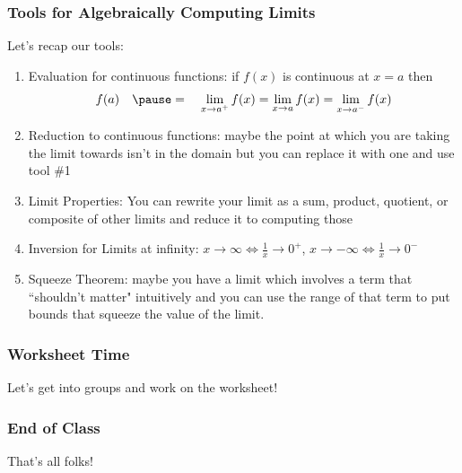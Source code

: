 \documentclass{ltx-talk}
\begin{document}
\begin{frame}
  \frametitle{Tools for Algebraically Computing Limits}

  Let's recap our tools: \pause
  \begin{enumerate}
    \item Evaluation for continuous functions: \pause if $f(x)$ is continuous at $x = a$ then \pause
      \begin{equation}
        f(a) \quad \pause = \quad \lim_{x \rightarrow a^{+}} f(x) = \lim_{x \rightarrow a} f(x) = \lim_{x \rightarrow a^{-}} f(x)
      \end{equation} \pause
    \item Reduction to continuous functions: \pause maybe the point at which you are taking the limit towards isn't in the domain \pause
      but you can replace it with one and use tool \#1
    \item Limit Properties: \pause You can rewrite your limit as a sum, product, quotient, or composite of other limits 
      and reduce it to computing those \pause
    \item Inversion for Limits at infinity: \pause $x \rightarrow \infty \iff \frac{1}{x} \rightarrow 0^{+}$, $x \rightarrow -\infty \iff \frac{1}{x} \rightarrow 0^{-}$ \pause
    \item Squeeze Theorem: \pause maybe you have a limit which involves a term that ``shouldn't matter" intuitively \pause
      and you can use the range of that term to put bounds that squeeze the value of the limit.
  \end{enumerate}
\end{frame}

\begin{frame}
  \frametitle{Worksheet Time}

  Let's get into groups and work on the worksheet!
\end{frame}

\begin{frame}
  \frametitle{End of Class}

  That's all folks!
\end{frame}
\end{document}
